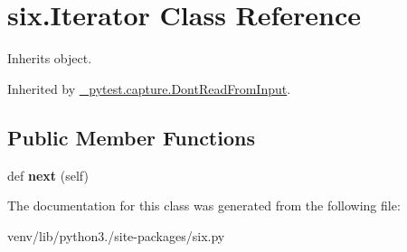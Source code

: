 \hypertarget{classsix_1_1_iterator}{}\section{six.\+Iterator Class Reference}
\label{classsix_1_1_iterator}


Inherits object.



Inherited by \hyperlink{class__pytest_1_1capture_1_1_dont_read_from_input}{\+\_\+pytest.\+capture.\+Dont\+Read\+From\+Input}.

\subsection*{Public Member Functions}
\begin{DoxyCompactItemize}
\item 
\mbox{\label{classsix_1_1_iterator_a2248c904e3068509258d20d89c2d64fd}} 
def {\bfseries next} (self)
\end{DoxyCompactItemize}


The documentation for this class was generated from the following file\+:\begin{DoxyCompactItemize}
\item 
venv/lib/python3./site-\/packages/six.\+py\end{DoxyCompactItemize}
